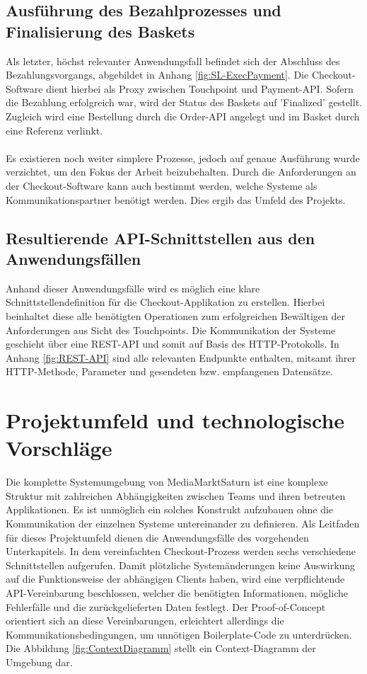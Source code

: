 \subsection{Ausführung des Bezahlprozesses und Finalisierung des Baskets}

Als letzter, höchst relevanter Anwendungsfall befindet sich der Abschluss des Bezahlungsvorgangs, abgebildet in Anhang \ref{fig:SL-ExecPayment}. Die Checkout-Software dient hierbei als Proxy zwischen Touchpoint und Payment-API. Sofern die Bezahlung erfolgreich war, wird der Status des Baskets auf 'Finalized' gestellt. Zugleich wird eine Bestellung durch die Order-API angelegt und im Basket durch eine Referenz verlinkt. \\\\

Es existieren noch weiter simplere Prozesse, jedoch auf genaue Ausführung wurde verzichtet, um den Fokus der Arbeit beizubehalten. Durch die Anforderungen an der Checkout-Software kann auch bestimmt werden, welche Systeme als Kommunikationspartner benötigt werden. Dies ergib das Umfeld des Projekts. 

\subsection{Resultierende API-Schnittstellen aus den Anwendungsfällen}

Anhand dieser Anwendungsfälle wird es möglich eine klare Schnittstellendefinition für die Checkout-Applikation zu erstellen. Hierbei beinhaltet diese alle benötigten Operationen zum erfolgreichen Bewältigen der Anforderungen aus Sicht des Touchpoints. Die Kommunikation der Systeme geschieht über eine \acrshort{REST}-API und somit auf Basis des \acrshort{HTTP}-Protokolls. In Anhang \ref{fig:REST-API} sind alle relevanten Endpunkte enthalten, mitsamt ihrer HTTP-Methode, Parameter und gesendeten bzw. empfangenen Datensätze.

\section{Projektumfeld und technologische Vorschläge}

Die komplette Systemumgebung von MediaMarktSaturn ist eine komplexe Struktur mit zahlreichen Abhängigkeiten zwischen Teams und ihren betreuten Applikationen. Es ist unmöglich ein solches Konstrukt aufzubauen ohne die Kommunikation der einzelnen Systeme untereinander zu definieren. Als Leitfaden für dieses Projektumfeld dienen die Anwendungsfälle des vorgehenden Unterkapitels. In dem vereinfachten Checkout-Prozess werden sechs verschiedene Schnittstellen aufgerufen. Damit plötzliche Systemänderungen keine Auswirkung auf die Funktionsweise der abhängigen Clients haben, wird eine verpflichtende API-Vereinbarung beschlossen, welcher die benötigten Informationen, mögliche Fehlerfälle und die zurückgelieferten Daten festlegt. Der Proof-of-Concept orientiert sich an diese Vereinbarungen, erleichtert allerdings die Kommunikationsbedingungen, um unnötigen \Gls{Boilerplate}-Code zu unterdrücken. Die Abbildung \ref{fig:ContextDiagramm} stellt ein Context-Diagramm der Umgebung dar.


